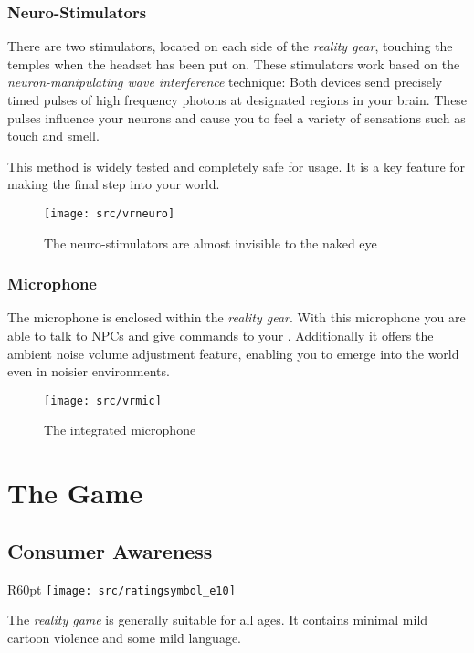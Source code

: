 \subsection{Neuro-Stimulators}
There are two stimulators, located on each side of the \emph{\poke{} reality gear}, touching the temples when the headset has been put on. These stimulators work based on the \emph{neuron-manipulating wave interference} technique: Both devices send precisely timed pulses of high frequency photons at designated regions in your brain. These pulses influence your neurons and cause you to feel a variety of sensations such as touch and smell. 

This method is widely tested and completely safe for usage. It is a key feature for making the final step into your \poke{} world.

\begin{figure}[!ht]
\begin{center}
\texttt{[image: src/vrneuro]}
\end{center}
\caption[The neuro-stimulators are almost invisible to the naked eye]{The neuro-stimulators are almost invisible to the naked eye}
\label{vrneuro}
\end{figure}

\subsection{Microphone}
The microphone is enclosed within the \emph{\poke{} reality gear}. With this microphone you are able to talk to NPCs and give commands to your \poke{}. Additionally it offers the ambient noise volume adjustment feature, enabling you to emerge into the \poke{} world even in noisier environments.

\begin{figure}[!ht]
\begin{center}
\texttt{[image: src/vrmic]}
\end{center}
\caption[The integrated microphone]{The integrated microphone}
\label{vrmic}
\end{figure}

\chapter{The Game}
\label{software}

\section{Consumer Awareness}
\begin{wrapfigure}{R}{60pt}
\vspace{-18pt}
\texttt{[image: src/ratingsymbol\_e10]}
\vspace{-30pt}
\end{wrapfigure}
The \emph{\poke{} reality game} is generally suitable for all ages. It contains minimal mild cartoon violence and some mild language.

